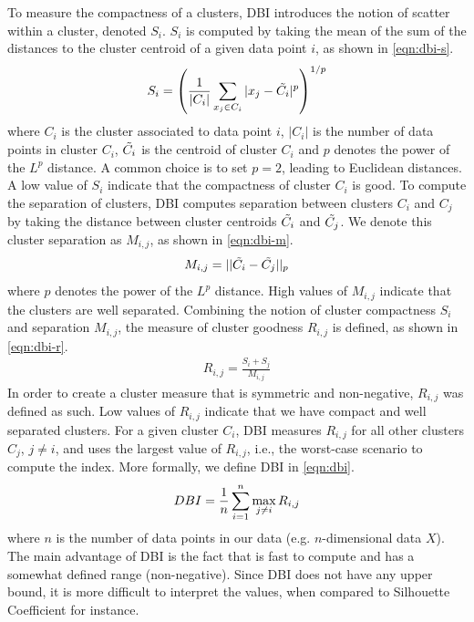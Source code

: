 To measure the compactness of a clusters, DBI introduces the notion of scatter within a cluster, denoted $S_i$. $S_i$ is computed by taking the mean of the sum of the distances to the cluster centroid of a given data point $i$, as shown in \cref{eqn:dbi-s}.
\begin{align}
    S_i = \left( \frac{1}{|C_i|} \sum\limits_{x_j \in C_i}^{} |x_j - \Tilde{C_i}|^p\right)^{1/p}
    \label{eqn:dbi-s}
\end{align}
where $C_i$ is the cluster associated to data point $i$, $|C_i|$ is the number of data points in cluster $C_i$, $\Tilde{C_i}$ is the centroid of cluster $C_i$ and $p$ denotes the power of the $L^p$ distance. A common choice is to set $p=2$, leading to Euclidean distances. A low value of $S_i$ indicate that the compactness of cluster $C_i$ is good. To compute the separation of clusters, DBI computes separation between clusters $C_i$ and $C_j$ by taking the distance between cluster centroids $\Tilde{C_i}$ and $\Tilde{C_j}$. We denote this cluster separation as $M_{i, j}$, as shown in \cref{eqn:dbi-m}.
\begin{align}
    M_{i, j} = ||\Tilde{C_i} - \Tilde{C_j}||_p
    \label{eqn:dbi-m}
\end{align}
where $p$ denotes the power of the $L^p$ distance. High values of $M_{i, j}$ indicate that the clusters are well separated. Combining the notion of cluster compactness $S_i$ and separation $M_{i, j}$, the measure of cluster goodness $R_{i, j}$ is defined, as shown in \cref{eqn:dbi-r}.
\begin{align}
    R_{i, j} = \frac{S_i + S_j}{M_{i, j}}
    \label{eqn:dbi-r}
\end{align}
In order to create a cluster measure that is symmetric and non-negative, $R_{i, j}$ was defined as such. Low values of $R_{i, j}$ indicate that we have compact and well separated clusters. For a given cluster $C_i$, DBI measures $R_{i, j}$ for all other clusters $C_j$, $j \neq i$, and uses the largest value of $R_{i, j}$, i.e., the worst-case scenario to compute the index. More formally, we define DBI in \cref{eqn:dbi}.
\begin{align}
    DBI = \frac{1}{n} \sum\limits_{i=1}^{n} \max_{j \neq i} R_{i, j}
    \label{eqn:dbi}
\end{align}
where $n$ is the number of data points in our data (e.g. $n$-dimensional data $X$). The main advantage of DBI is the fact that is fast to compute and has a somewhat defined range (non-negative). Since DBI does not have any upper bound, it is more difficult to interpret the values, when compared to Silhouette Coefficient for instance.

